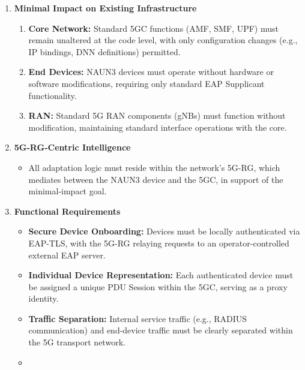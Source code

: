 \begin{enumerate}
    \item {
        \textbf{Minimal Impact on Existing Infrastructure}
        \begin{enumerate}
            \item {
                \textbf{Core Network:} Standard \ac{5GC} functions (\ac{AMF}, \ac{SMF}, \ac{UPF}) must remain unaltered at the code level, with only configuration changes (e.g., \ac{IP} bindings, \ac{DNN} definitions) permitted.
            }
            \item {
                \textbf{End Devices:} \ac{NAUN3} devices must operate without hardware or software modifications, requiring only standard \ac{EAP} Supplicant functionality.
            }
            \item {
                \textbf{\ac{RAN}:} Standard \ac{5G} \ac{RAN} components (\acp{gNB}) must function without modification, maintaining standard interface operations with the core.
            }
        \end{enumerate}
    }
    \item {
        \textbf{\ac{5G-RG}-Centric Intelligence}
        \begin{itemize}
            \item {
                All adaptation logic must reside within the network's \ac{5G-RG}, which mediates between the \ac{NAUN3} device and the \ac{5GC}, in support of the minimal-impact goal.
            }
        \end{itemize}
    }
    \item {
        \textbf{Functional Requirements}
        \begin{itemize}
            \item {
                \textbf{Secure Device Onboarding:} Devices must be locally authenticated via \ac{EAP-TLS}, with the \ac{5G-RG} relaying requests to an operator-controlled external \ac{EAP} server.
            }
            \item {
                \textbf{Individual Device Representation:} Each authenticated device must be assigned a unique \ac{PDU} Session within the \ac{5GC}, serving as a proxy identity.
            }
            \item {
                \textbf{Traffic Separation:} Internal service traffic (e.g., \ac{RADIUS} communication) and end-device traffic must be clearly separated within the \ac{5G} transport network.
            }
            \item {
}
\end{itemize}}
\end{enumerate}
